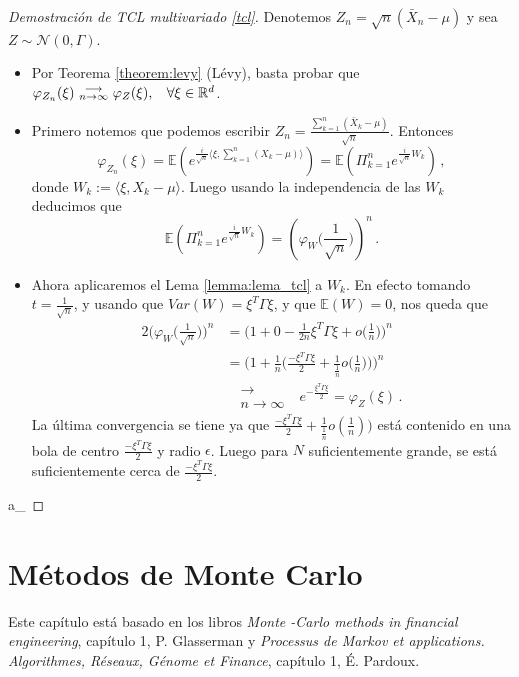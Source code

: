 \documentclass[letterpaper,11pt]{article} %
\def\espacio{\hspace{.25cm}\,}
\theoremstyle{defbreak}
\theoremstyle{propbreak}
\theoremstyle{remark}
\theoremstyle{break}
\def\R{\mathbb{R}}
\def\E{\mathbb{E}}
\def\var{Var}
\def\conv{\mbox{ }\substack{\longrightarrow \\ n\to\infty}\mbox{ }}
\def\gris{\color{mygray}}
\def\negro{\color{black}}
\def\findem{\null\hfill\color{white}a\color{black}_\square}
\begin{document}
\begin{proof}[Demostración de TCL multivariado \ref{tcl}]
\gris Denotemos $Z_n = \sqrt{n}(\bar{X}_n-\mu)$ y sea $Z\sim\mathcal{N}(0,\Gamma)$. 
\begin{itemize}
    \item Por Teorema \ref{theorem:levy} (Lévy), basta probar que $\varphi_{Z_n}(\xi)\conv \varphi_Z(\xi), \espacio \forall\xi\in\R^d$.
    \item Primero notemos que podemos escribir $Z_n=\displaystyle \frac{\sum^n_{k=1}(\bar{X}_k-\mu)}{\sqrt{n}}$. Entonces %
    $$\displaystyle\varphi_{Z_n}(\xi) = \displaystyle \E(e^{\frac{i}{\sqrt{n}}\langle\xi,\sum^n_{k=1}(X_k-\mu)\rangle})=\displaystyle\E(\Pi^n_{k=1}e^{\frac{i}{\sqrt{n}}W_k}) \, ,$$
    donde $W_k:=\langle\xi,X_k-\mu\rangle$. Luego usando la independencia de las $W_k$ deducimos que 
    $$ \displaystyle\E(\Pi^n_{k=1}e^{\frac{i}{\sqrt{n}}W_k}) = (\varphi_W\bigg(\frac{1}{\sqrt{n}}\bigg))^n  \, .$$
    \item Ahora aplicaremos el Lema \ref{lemma:lema_tcl} a $W_k$. En efecto tomando $t=\frac{1}{\sqrt{n}}$, y usando que $\var(W)=\xi^T\Gamma\xi$, y que $\E(W)=0$, nos queda que
    \begin{alignat*}{2}
        \bigg(\varphi_W\bigg(\frac{1}{\sqrt{n}}\bigg)\bigg)^n & = \bigg(1+0-\frac{1}{2n}\xi^T\Gamma\xi+o\bigg(\frac{1}{n}\bigg)\bigg)^n \\
         & = \bigg(1+\frac{1}{n}\bigg(\frac{-\xi^T\Gamma\xi}{2}+\frac{1}{\frac{1}{n}}o\bigg(\frac{1}{n}\bigg)\bigg)\bigg)^n \\
         & \conv e^{-\frac{\xi^T\Gamma\xi}{2}}=\varphi_Z(\xi)  \, .
    \end{alignat*}
    La última convergencia se tiene ya que $\frac{-\xi^T\Gamma\xi}{2}+\frac{1}{\frac{1}{n}}o(\frac{1}{n}))$ está contenido en una bola de centro $\frac{-\xi^T\Gamma\xi}{2}$ y radio $\epsilon$. Luego para $N$ suficientemente grande, se está suficientemente cerca de $\frac{-\xi^T\Gamma\xi}{2}$.  %
\end{itemize}
\findem \negro
\end{proof}

\newpage
\section{Métodos de Monte Carlo}
Este capítulo está basado en los libros \textit{Monte -Carlo methods in financial engineering}, capítulo 1, P. Glasserman \cite{glass} y \textit{Processus de Markov et applications. Algorithmes, Réseaux, Génome et Finance}, capítulo 1, É. Pardoux\cite{pardoux}.
\end{document}

